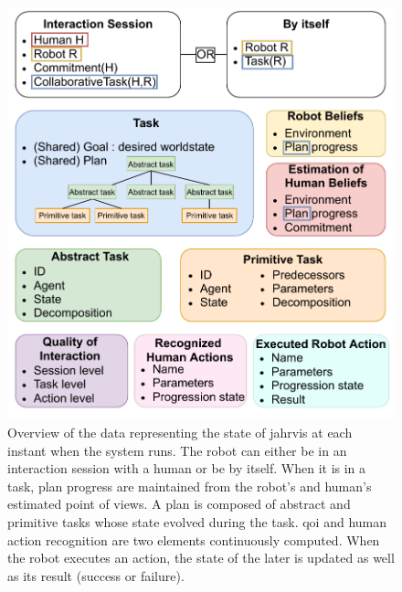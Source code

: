 \documentclass[a4paper,11pt,twoside]{StyleThese}
\begin{document}
\begin{figure}[!ht]
	\includegraphics[width=\linewidth]{figures/chapter2/data_state_representation.pdf}
	\caption{Overview of the data representing the state of \acrshort{jahrvis} at each instant when the system runs. The robot can either be in an interaction session with a human or be by itself. When it is in a task, plan progress are maintained from the robot's and human's estimated point of views. A plan is composed of abstract and primitive tasks whose state evolved during the task. \acrshort{qoi} and human action recognition are two elements continuously computed. When the robot executes an action, the state of the later is updated as well as its result (success or failure).}
	\label{chap5:fig:data_state}
\end{figure}
\end{document}
